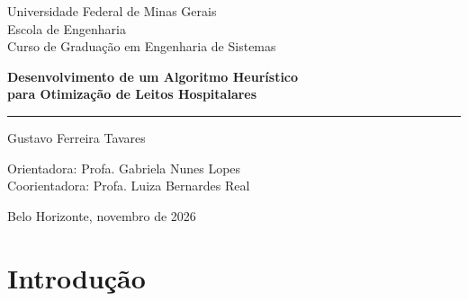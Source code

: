 \documentclass[aspectratio=169,10pt]{beamer}
\begin{document}
\nocite{brandeau2004operations, schafer2023combining, he2019systematic, paim2011brazilian,
        bittencourt2009intervencoes, ceschia2012modeling, ceschia2011local, demeester2010hybrid,
        talbi2009metaheuristics, belien2007building, ala2022appointment, tavares2026repositorio,
        aiex2007ttt}

\begin{frame}[plain]
    \centering
    {\small Universidade Federal de Minas Gerais\\
    Escola de Engenharia\\
    Curso de Graduação em Engenharia de Sistemas\par}

    \vspace{0.9cm}
    {\LARGE\bfseries
    Desenvolvimento de um Algoritmo Heurístico\\[2pt]
    para Otimização de Leitos Hospitalares\par}

    \vspace{0.3cm}
    {\color{primary}\rule{0.5\textwidth}{1pt}\par}

    \vspace{0.6cm}
    {\large Gustavo Ferreira Tavares\par}

    \vspace{0.5cm}
    {\small Orientadora: Profa. Gabriela Nunes Lopes\\
    Coorientadora: Profa. Luiza Bernardes Real\par}

    \vspace{0.7cm}
    {\footnotesize Belo Horizonte, novembro de 2026\par}
\end{frame}

\section{Introdução}
\end{document}
